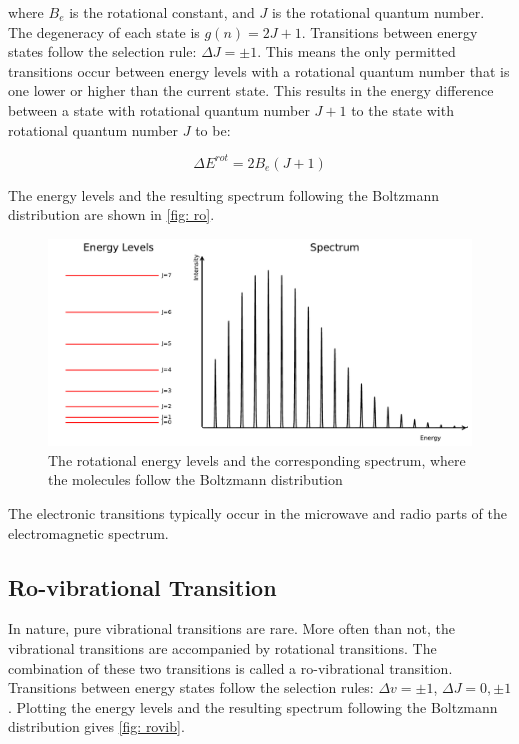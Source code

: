 \documentclass[twoside, single, authoryear, semicolon, 12pt]{lion-msc}
\newcommand{\4}{$_4$}
\newcommand{\3}{$_3$}
\newcommand{\2}{$_2$}
\begin{document}
where $B_e$ is the rotational constant, and $J$ is the rotational quantum number. 
The degeneracy of each state is $g(n)=2J+1$. Transitions between energy states follow the selection rule: $\Delta J=\pm 1$. This means the only permitted transitions occur between energy levels with a rotational quantum number that is one lower or higher than the current state. This results in the energy difference between a state with rotational quantum number $J+1$ to the state with rotational quantum number $J$ to be:

\begin{equation}
    \Delta  E^{rot}=2B_e(J+1)
\end{equation}

The energy levels and the resulting spectrum following the Boltzmann distribution are shown in \autoref{fig: ro}.

\begin{figure}[H]
    \centering
    \includegraphics[width=\linewidth]{Figures/RoSpectrum.pdf}
    \caption{The rotational energy levels and the corresponding spectrum, where the molecules follow the Boltzmann distribution}
    \label{fig: ro}
\end{figure}

The electronic transitions typically occur in the microwave and radio parts of the electromagnetic spectrum.

\subsection{Ro-vibrational Transition}
In nature, pure vibrational transitions are rare. More often than not, the vibrational transitions are accompanied by rotational transitions. The combination of these two transitions is called a ro-vibrational transition. Transitions between energy states follow the selection rules: $\Delta v=\pm 1$, $\Delta J=0, \pm 1$. Plotting the energy levels and the resulting spectrum following the Boltzmann distribution gives \autoref{fig: rovib}.
\end{document}
